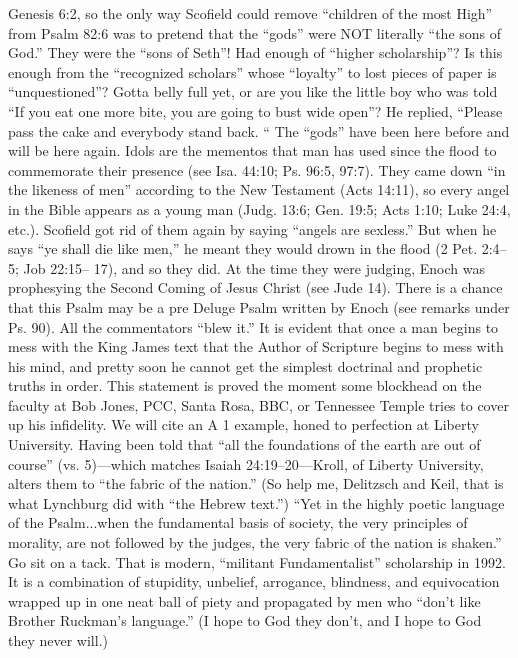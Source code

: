 {Genesis 6:2, so the only way Scofield could
remove “children of the most High” from
Psalm 82:6 was to pretend that the “gods”
were NOT literally “the sons of God.” They
were the “sons of Seth”!
Had enough of “higher scholarship”? Is this
enough from the “recognized scholars” whose
“loyalty” to lost pieces of paper is
“unquestioned”? Gotta belly full yet, or are
you like the little boy who was told “If you eat
one more bite, you are going to bust wide
open”? He replied, “Please pass the cake and
everybody stand back. “
The “gods” have been here before and will
be here again. Idols are the mementos that
man has used since the flood to
commemorate their presence (see Isa. 44:10;
Ps. 96:5, 97:7). They came down “in the
likeness of men” according to the New
Testament (Acts 14:11), so every angel in the
Bible appears as a young man (Judg. 13:6;
Gen. 19:5; Acts 1:10; Luke 24:4, etc.).
Scofield got rid of them again by saying
“angels are sexless.” But when he says “ye
shall die like men,” he meant they would
drown in the flood (2 Pet. 2:4–5; Job 22:15–
17), and so they did. At the time they were
judging, Enoch was prophesying the Second
Coming of Jesus Christ (see Jude 14).
There is a chance that this Psalm may be a
pre Deluge Psalm written by Enoch (see
remarks under Ps. 90).
All the commentators “blew it.” It is evident
that once a man begins to mess with the King
James text that the Author of Scripture begins
to mess with his mind, and pretty soon he
cannot get the simplest doctrinal and
prophetic truths in order. This statement is
proved the moment some blockhead on the
faculty at Bob Jones, PCC, Santa Rosa,
BBC, or Tennessee Temple tries to cover up
his infidelity. We will cite an A 1 example,
honed to perfection at Liberty University.
Having been told that “all the foundations of
the earth are out of course” (vs. 5)—which
matches Isaiah 24:19–20—Kroll, of Liberty
University, alters them to “the fabric of the
nation.” (So help me, Delitzsch and Keil, that
is what Lynchburg did with “the Hebrew
text.”)
``Yet in the highly poetic language of the Psalm...when the fundamental basis of society, the very principles of morality, are not followed by the judges, the very fabric of the nation is shaken.'' Go sit on a tack. That is modern, “militant Fundamentalist” scholarship in 1992. It is a combination of stupidity, unbelief, arrogance, blindness, and equivocation wrapped up in one neat ball of piety and propagated by men who “don’t like Brother Ruckman’s language.” (I hope to God they don’t, and I hope to God they never will.) \cite{Ruckman1992Psalms}}
